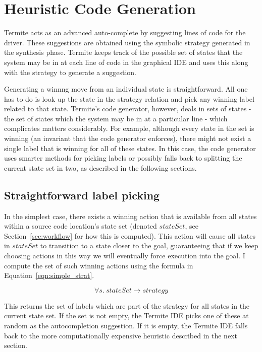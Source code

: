 \section{Heuristic Code Generation}
\label{sec:heuristic_codegen}

Termite acts as an advanced auto-complete by suggesting lines of code for the driver. These suggestions are obtained using the symbolic strategy generated in the synthesis phase. Termite keeps track of the possible set of states that the system may be in at each line of code in the graphical IDE and uses this along with the strategy to generate a suggestion. 

Generating a winnng move from an individual state is straightforward. All one has to do is look up the state in the strategy relation and pick any winning label related to that state. Termite's code generator, however, deals in sets of states - the set of states which the system may be in at a particular line - which complicates matters considerably. For example, although every state in the set is winning (an invariant that the code generator enforces), there might not exist a single label that is winning for all of these states. In this case, the code generator uses smarter methods for picking labels or possibly falls back to splitting the current state set in two, as described in the following sections.

\subsection{Straightforward label picking}

In the simplest case, there exists a winning action that is available from all states within a source code location's state set (denoted $stateSet$, see Section~\ref{sec:workflow} for how this is computed). This action will cause all states in $stateSet$ to transition to a state closer to the goal, guaranteeing that if we keep choosing actions in this way we will eventually force execution into the goal. I compute the set of such winning actions using the formula in Equation~\ref{eqn:simple_strat}. 

\begin{equation}
\forall s. \: stateSet \rightarrow strategy
\label{eqn:simple_strat}
\end{equation}

This returns the set of labels which are part of the strategy for all states in the current state set. If the set is not empty, the Termite IDE picks one of these at random as the autocompletion suggestion. If it is empty, the Termite IDE falls back to the more computationally expensive heuristic described in the next section.

